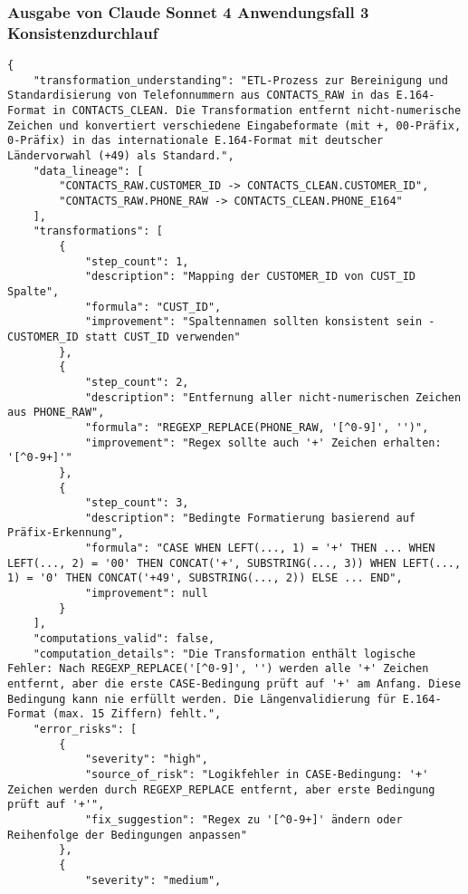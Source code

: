 \subsubsection{Ausgabe von Claude Sonnet 4 Anwendungsfall 3 Konsistenzdurchlauf}\label{anhang:subsubsec:claude_case3_prompt2}
\begin{lstlisting}[caption={Ausgabe: Claude Sonnet 4 Anwendungsfall 3 Konsistenzdurchlauf},label={claude_case3_prompt2}]
{
    "transformation_understanding": "ETL-Prozess zur Bereinigung und Standardisierung von Telefonnummern aus CONTACTS_RAW in das E.164-Format in CONTACTS_CLEAN. Die Transformation entfernt nicht-numerische Zeichen und konvertiert verschiedene Eingabeformate (mit +, 00-Präfix, 0-Präfix) in das internationale E.164-Format mit deutscher Ländervorwahl (+49) als Standard.",
    "data_lineage": [
        "CONTACTS_RAW.CUSTOMER_ID -> CONTACTS_CLEAN.CUSTOMER_ID",
        "CONTACTS_RAW.PHONE_RAW -> CONTACTS_CLEAN.PHONE_E164"
    ],
    "transformations": [
        {
            "step_count": 1,
            "description": "Mapping der CUSTOMER_ID von CUST_ID Spalte",
            "formula": "CUST_ID",
            "improvement": "Spaltennamen sollten konsistent sein - CUSTOMER_ID statt CUST_ID verwenden"
        },
        {
            "step_count": 2,
            "description": "Entfernung aller nicht-numerischen Zeichen aus PHONE_RAW",
            "formula": "REGEXP_REPLACE(PHONE_RAW, '[^0-9]', '')",
            "improvement": "Regex sollte auch '+' Zeichen erhalten: '[^0-9+]'"
        },
        {
            "step_count": 3,
            "description": "Bedingte Formatierung basierend auf Präfix-Erkennung",
            "formula": "CASE WHEN LEFT(..., 1) = '+' THEN ... WHEN LEFT(..., 2) = '00' THEN CONCAT('+', SUBSTRING(..., 3)) WHEN LEFT(..., 1) = '0' THEN CONCAT('+49', SUBSTRING(..., 2)) ELSE ... END",
            "improvement": null
        }
    ],
    "computations_valid": false,
    "computation_details": "Die Transformation enthält logische Fehler: Nach REGEXP_REPLACE('[^0-9]', '') werden alle '+' Zeichen entfernt, aber die erste CASE-Bedingung prüft auf '+' am Anfang. Diese Bedingung kann nie erfüllt werden. Die Längenvalidierung für E.164-Format (max. 15 Ziffern) fehlt.",
    "error_risks": [
        {
            "severity": "high",
            "source_of_risk": "Logikfehler in CASE-Bedingung: '+' Zeichen werden durch REGEXP_REPLACE entfernt, aber erste Bedingung prüft auf '+'",
            "fix_suggestion": "Regex zu '[^0-9+]' ändern oder Reihenfolge der Bedingungen anpassen"
        },
        {
            "severity": "medium",

\end{lstlisting}
